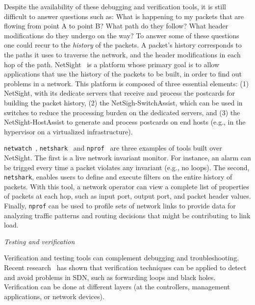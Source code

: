 Despite the availability of these debugging and verification tools, it is still difficult to answer questions such as: What is happening to my packets that are flowing from point A to point B? What path do they follow? What header modifications do they undergo on the way? 
To answer some of these questions one could recur to the \emph{history} of the packets. A packet's history corresponds 
to the paths it uses to traverse the network, and the header modifications in each hop of the path.
NetSight~\cite{handigol2014} is a platform whose primary goal is to allow applications that use the history of the packets to be built, in order to find out problems in a network.
This platform is composed of three essential elements: (1) NetSight, with its dedicate servers that receive and 
process the postcards for building the packet history, (2) the NetSigh-SwitchAssist, which can be used in 
switches to reduce the processing burden on the dedicated servers, and (3) the NetSight-HostAssist to generate 
and process postcards on end hosts (e.g., in the hypervisor on a virtualized infrastructure).

\texttt{netwatch}~\cite{handigol2014}, \texttt{netshark}~\cite{handigol2014} and \texttt{nprof}~\cite{handigol2014} are three examples of tools built over NetSight.
The first is a live network invariant monitor. 
For instance, an alarm can be trigged every time a packet violates any invariant (e.g., no loops).
The second, \texttt{netshark}, enables users to define and execute filters on the entire history of packets.
With this tool, a network operator can view a complete list of properties of packets at each hop, such as input port, output port, and packet header values.
Finally, \texttt{nprof} can be used to profile sets of network links to provide data for analyzing 
traffic patterns and routing decisions that might be contributing to link load.

\vspace{2mm}
\noindent \textit{Testing and verification}

Verification and testing tools can complement debugging and troubleshooting.
Recent research~\cite{khurshid2012,altekar2010,al-shaer2010,canini2012-1,kuzniar2012,ruchansky2013,zeng2014} 
has shown that verification techniques can be applied to detect and avoid problems in SDN, 
such as forwarding loops and black holes. Verification can be done at different layers (at the controllers, management applications, or network devices).


